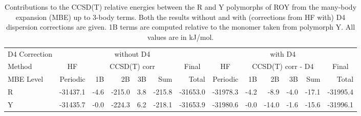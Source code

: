 \begin{table}[h]

\caption{\label{tab:roy_mbe_contributions}Contributions to the CCSD(T) relative energies between the R and Y polymorphs of ROY from the many-body expansion (MBE) up to 3-body terms. Both the results without and with (corrections from HF with) D4 dispersion corrections are given. 1B terms are computed relative to the monomer taken from polymorph Y. All values are in kJ/mol.}
\begin{tabular}{lrrrrrrrrrrrr}
\toprule
D4 Correction & \multicolumn{6}{c}{without D4} & \multicolumn{6}{c}{with D4} \\ \cmidrule(lr){2-7} \cmidrule(lr){8-13} 
Method & \multicolumn{1}{c}{HF} & \multicolumn{4}{c}{CCSD(T) corr} & \multicolumn{1}{c}{Final} & \multicolumn{1}{c}{HF} & \multicolumn{4}{c}{CCSD(T) corr - D4} & \multicolumn{1}{c}{Final} \\ \cmidrule(lr){2-2} \cmidrule(lr){3-6} \cmidrule(lr){7-7} \cmidrule(lr){8-8} \cmidrule(lr){9-12} \cmidrule(lr){13-13}
MBE Level & Periodic & 1B & 2B & 3B & Sum & Total & Periodic & 1B & 2B & 3B & Sum & Total \\
\midrule
R & -31437.1 & -4.6 & -215.0 & 3.8 & -215.8 & -31653.0 & -31978.3 & -4.2 & -8.9 & -4.0 & -17.1 & -31995.4 \\
Y & -31435.7 & -0.0 & -224.3 & 6.2 & -218.1 & -31653.9 & -31980.6 & -0.0 & -14.0 & -1.6 & -15.6 & -31996.1 \\
\bottomrule
\end{tabular}

\end{table}